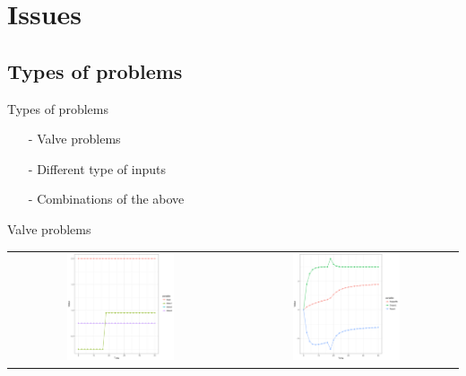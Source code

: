 \documentclass{beamer}
\def\itemizespace{\vspace{7mm}}
\begin{document}
\section{Issues}
\subsection{Types of problems}
\begin{frame}{Types of problems}
	\begin{itemize}[<+->]
		\item[-] Valve problems
		\itemizespace%

		\item[-] Different type of inputs
		\itemizespace%

		\item[-] Combinations of the above
	\end{itemize}
\end{frame}

\begin{frame}{Valve problems}
	\begin{table}
		\begin{tabular}{ cc }
			\includegraphics[width=0.5\textwidth]{issues_v1_input.png} &
			\includegraphics[width=0.5\textwidth]{issues_v1_output.png} \\
		\end{tabular}
	\end{table}
\end{frame}
\end{document}
